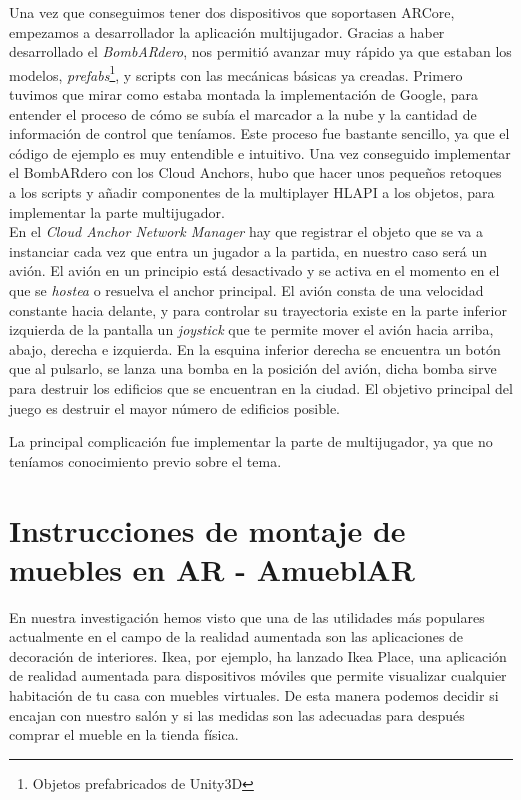 Una vez que conseguimos tener dos dispositivos que soportasen ARCore, empezamos a desarrollador la aplicación multijugador. Gracias a haber desarrollado el \textit{BombARdero}, nos permitió avanzar muy rápido ya que estaban los modelos, \textit{prefabs}\footnote{ Objetos prefabricados de Unity3D}, y scripts con las mecánicas básicas ya creadas. Primero tuvimos que mirar como estaba montada la implementación de Google, para entender el proceso de cómo se subía el marcador a la nube y la cantidad de información de control que teníamos. Este proceso fue bastante sencillo, ya que el código de ejemplo es muy entendible e intuitivo. Una vez conseguido implementar el BombARdero con los Cloud Anchors, hubo que hacer unos pequeños retoques a los scripts y añadir componentes de la multiplayer HLAPI a los objetos, para implementar la parte multijugador.\\

En el \textit{Cloud Anchor Network Manager} hay que registrar el objeto que se va a instanciar cada vez que entra un jugador a la partida, en nuestro caso será un avión. El avión en un principio está desactivado y se activa en el momento en el que se \textit{hostea} o resuelva el anchor principal. El avión consta de una velocidad constante hacia delante, y para controlar su trayectoria existe en la parte inferior izquierda de la pantalla un \textit{joystick} que te permite mover el avión hacia arriba, abajo, derecha e izquierda. En la esquina inferior derecha se encuentra un botón que al pulsarlo, se lanza una bomba en la posición del avión, dicha bomba sirve para destruir los edificios que se encuentran en la ciudad. El objetivo principal del juego es destruir el mayor número de edificios posible.

La principal complicación fue implementar la parte de multijugador, ya que no teníamos conocimiento previo sobre el tema.


\clearpage
\section{Instrucciones de montaje de muebles en AR - AmueblAR}

En nuestra investigación hemos visto que una de las utilidades más populares actualmente en el campo de la realidad aumentada son las aplicaciones de decoración de interiores. Ikea, por ejemplo, ha lanzado Ikea Place, una aplicación de realidad aumentada para dispositivos móviles que permite visualizar cualquier habitación de tu casa con muebles virtuales. De esta manera podemos decidir si encajan con nuestro salón y si las medidas son las adecuadas para después comprar el mueble en la tienda física.\\

